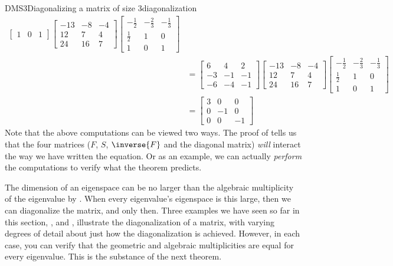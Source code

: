 \begin{example}{DMS3}{Diagonalizing a matrix of size 3}{diagonalization}
\begin{align*}
{\begin{bmatrix}
1 & 0 & 1
\end{bmatrix}
}
\begin{bmatrix}
-13 & -8 & -4\\ 
12 & 7 & 4\\ 
24 & 16 & 7
\end{bmatrix}
\begin{bmatrix}
-\frac{1}{2} & -\frac{2}{3} & -\frac{1}{3}\\
\frac{1}{2} & 1 & 0\\
1 & 0 & 1
\end{bmatrix}\\
&=
\begin{bmatrix}
6 & 4 & 2\\
-3 & -1 & -1\\
-6 & -4 & -1
\end{bmatrix}
\begin{bmatrix}
-13 & -8 & -4\\ 
12 & 7 & 4\\ 
24 & 16 & 7
\end{bmatrix}
\begin{bmatrix}
-\frac{1}{2} & -\frac{2}{3} & -\frac{1}{3}\\
\frac{1}{2} & 1 & 0\\
1 & 0 & 1
\end{bmatrix}\\
&=
\begin{bmatrix}
3 & 0 & 0\\
0 & -1 & 0\\
0 & 0 & -1
\end{bmatrix}
%
\end{align*}
%
Note that the above computations can be viewed two ways.  The proof of  tells us that the four matrices ($F$, $S$, $\inverse{F}$ and the diagonal matrix) {\em will} interact the way we have written the equation.  Or as an example, we can actually {\em perform} the computations to verify what the theorem predicts.
\end{example}
%
The dimension of an eigenspace can be no larger than the algebraic multiplicity of the eigenvalue by .  When every eigenvalue's eigenspace is this large, then we can diagonalize the matrix, and only then.   Three examples we have seen so far in this section,  ,   and ,  illustrate the diagonalization of a matrix, with varying degrees of detail about just how the diagonalization is achieved.  However, in each case, you can verify that the geometric and algebraic multiplicities are equal for every eigenvalue.  This is the substance of the next theorem.
